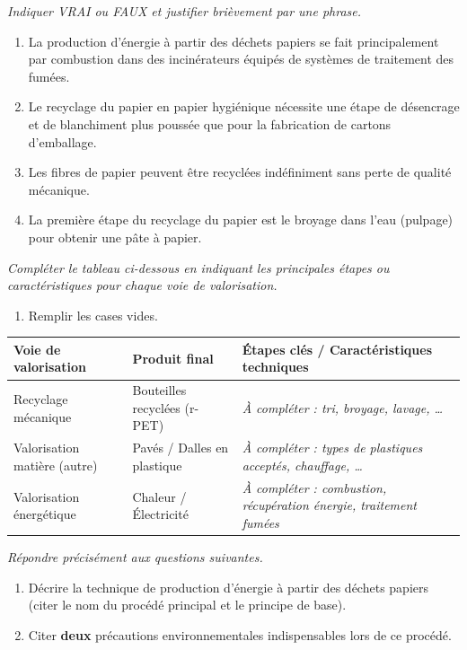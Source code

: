 \documentclass[11pt]{article}
\begin{document}
\begin{exercice}
\emph{Indiquer VRAI ou FAUX et justifier brièvement par une phrase.}
\begin{enumerate}
    \item La production d'énergie à partir des déchets papiers se fait principalement par combustion dans des incinérateurs équipés de systèmes de traitement des fumées.
    \item Le recyclage du papier en papier hygiénique nécessite une étape de désencrage et de blanchiment plus poussée que pour la fabrication de cartons d'emballage.
    \item Les fibres de papier peuvent être recyclées indéfiniment sans perte de qualité mécanique.
    \item La première étape du recyclage du papier est le broyage dans l'eau (pulpage) pour obtenir une pâte à papier.
\end{enumerate}
\end{exercice}

\begin{exercice}
\emph{Compléter le tableau ci-dessous en indiquant les principales étapes ou caractéristiques pour chaque voie de valorisation.}
\begin{enumerate}
    \item Remplir les cases vides.
\end{enumerate}

\medskip
\noindent\begin{tabular}{|p{3.5cm}|p{5.5cm}|p{5.5cm}|}
\hline
\textbf{Voie de valorisation} & \textbf{Produit final} & \textbf{Étapes clés / Caractéristiques techniques} \\
\hline
Recyclage mécanique & Bouteilles recyclées (r-PET) & \textit{À compléter : tri, broyage, lavage, \dots} \\
\hline
Valorisation matière (autre) & Pavés / Dalles en plastique & \textit{À compléter : types de plastiques acceptés, chauffage, \dots} \\
\hline
Valorisation énergétique & Chaleur / Électricité & \textit{À compléter : combustion, récupération énergie, traitement fumées} \\
\hline
\end{tabular}
\end{exercice}

\begin{exercice}
\emph{Répondre précisément aux questions suivantes.}
\begin{enumerate}
    \item Décrire la technique de production d'énergie à partir des déchets papiers (citer le nom du procédé principal et le principe de base).
    \item Citer \textbf{deux} précautions environnementales indispensables lors de ce procédé.
\end{enumerate}
\end{exercice}
\end{document}
